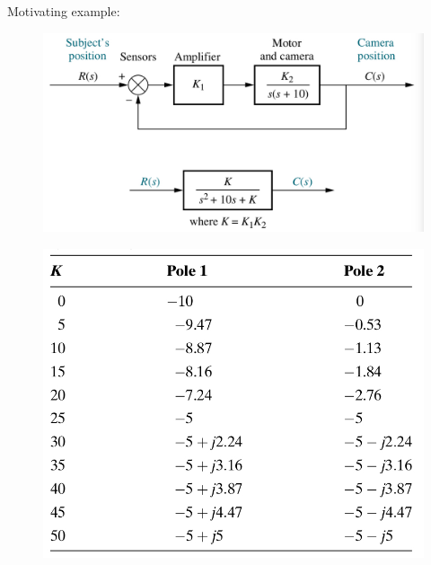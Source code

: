 \documentclass[ 10pt, xcolor = dvipsnames]{beamer}
\begin{document}
\begin{frame}[allowframebreaks]
\frametitle{\insertsection}

Motivating example: 
\fullskip

\begin{figure}
\centering
\includegraphics[width=0.68\columnwidth]{figures/Nise_Figure-8-4.jpg}
\end{figure}
\framebreak

\begin{figure}
\centering
\includegraphics[width=0.56\columnwidth]{figures/Nise_Table-8-1.jpg}
\end{figure}

\end{frame}
\end{document}
